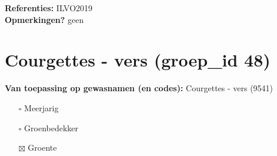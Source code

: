 \documentclass{article}
\begin{document}
  \textbf{Referenties:} ILVO2019 \vspace{0.10cm} \\ 
  \textbf{Opmerkingen?} geen \vspace{0.10cm} \\ 
 \newpage 
 \section{Courgettes - vers (groep\_id 48)} 
 \textbf{Van toepassing op gewasnamen (en codes):} Courgettes - vers (9541) 
 \begin{multicols}{3} \begin{itemize} \item[$\square$] Meerjarig \item[$\square$] Groenbedekker \item[$\boxtimes$] Groente \end{itemize} \end{multicols} 
\end{document}
